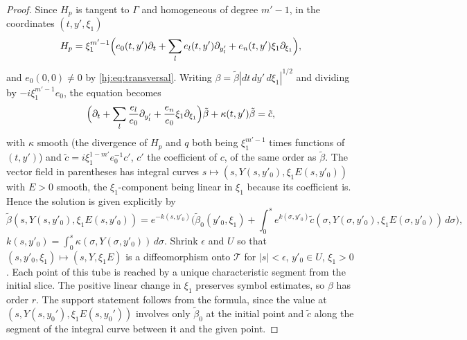\begin{proof}
  Since $H_p$ is tangent to $\Gamma$ and homogeneous of degree $m'-1$, in the
  coordinates $(t,y',\xi_1)$
  \begin{equation*}
    H_p=\xi_1^{m'-1}\Big(e_0(t,y')\partial_t+\sum_le_l(t,y')\partial_{y'_l}
    +e_{n}(t,y')\xi_1\partial_{\xi_1}\Big),
  \end{equation*}
  and $e_0(0,0)\neq0$ by \eqref{hj:eq:transversal}.  Writing
  $\beta=\tilde\beta|dt\,dy'\,d\xi_1|^{1/2}$ and dividing by
  $-i\xi_1^{m'-1}e_0$, the equation becomes
  \begin{equation*}
    \Big(\partial_t+\sum_l\frac{e_l}{e_0}\partial_{y'_l}+\frac{e_n}{e_0}\xi_1\partial_{\xi_1}\Big)\tilde\beta
    +\kappa(t,y')\tilde\beta=\tilde c,
  \end{equation*}
  with $\kappa$ smooth (the divergence of $H_p$ and $q$ both being $\xi_1^{m'-1}$
  times functions of $(t,y')$) and $\tilde c=i\xi_1^{1-m'}e_0^{-1}c'$, $c'$ the
  coefficient of $c$, of the same order as $\tilde\beta$.  The vector field in
  parentheses has integral curves $s\mapsto(s,Y(s,y'_0),\xi_1E(s,y'_0))$ with
  $E>0$ smooth, the $\xi_1$-component being linear in $\xi_1$ because its
  coefficient is.  Hence the solution is given explicitly by
  \begin{equation*}
    \tilde\beta(s,Y(s,y'_0),\xi_1E(s,y'_0))=e^{-k(s,y'_0)}\Big(\tilde\beta_0(y'_0,\xi_1)
    +\int_0^se^{k(\sigma,y'_0)}\tilde c(\sigma,Y(\sigma,y'_0),\xi_1E(\sigma,y'_0))
    \,d\sigma\Big),
  \end{equation*}
  $k(s,y'_0)=\int_0^s\kappa(\sigma,Y(\sigma,y'_0))\,d\sigma$.
  Shrink $\epsilon$ and $U$ so that $(s,y'_0,\xi_1)\mapsto(s,Y,\xi_1E)$ is a
  diffeomorphism onto $\mathcal T$ for $|s|<\epsilon$, $y'_0\in U$,
  $\xi_1>0$. Each point of this tube is reached by a unique characteristic
  segment from the initial slice. The positive linear change in $\xi_1$
  preserves symbol estimates, so $\beta$ has order $r$.  The support statement follows from the formula, since the value at
  $(s,Y(s,y_0'),\xi_1E(s,y_0'))$ involves only $\tilde\beta_0$ at the initial point and
  $\tilde c$ along the segment of the integral curve between it and the given point.
\end{proof}

